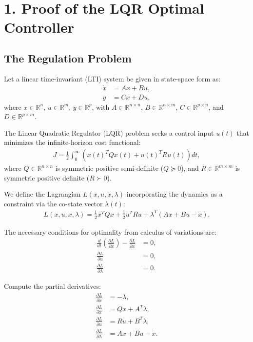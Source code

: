 \section*{1. Proof of the LQR Optimal Controller}\label{sec:lqr-proof}

\subsection*{The Regulation Problem}
Let a linear time-invariant (LTI) system be given in state-space form as:
\begin{align*}
\dot{x} &= Ax + Bu, \\
y &= Cx + Du,
\end{align*}
where $x \in \mathbb{R}^n$, $u \in \mathbb{R}^m$, $y \in \mathbb{R}^p$, with $A \in \mathbb{R}^{n \times n}$, $B \in \mathbb{R}^{n \times m}$, $C \in \mathbb{R}^{p \times n}$, and $D \in \mathbb{R}^{p \times m}$.

The Linear Quadratic Regulator (LQR) problem seeks a control input $u(t)$ that minimizes the infinite-horizon cost functional:
\begin{align*}
J = \frac{1}{2} \int_0^\infty \left( x(t)^T Q x(t) + u(t)^T R u(t) \right) d t,
\end{align*}
where $Q \in \mathbb{R}^{n \times n}$ is symmetric positive semi-definite ($Q \succeq 0$), and $R \in \mathbb{R}^{m \times m}$ is symmetric positive definite ($R \succ 0$).

\hrulefill

We define the Lagrangian \( L(x, u, \dot{x}, \lambda) \) incorporating the dynamics as a constraint via the co-state vector $\lambda(t)$:
\begin{align*}
L(x,u,\dot{x},\lambda) = \frac{1}{2} x^T Q x + \frac{1}{2} u^T R u + \lambda^T (Ax + Bu - \dot{x}).
\end{align*}

\hrulefill

The necessary conditions for optimality from calculus of variations are:
\begin{align*}
\frac{d}{dt} \left( \frac{\partial L}{\partial \dot{x}} \right) - \frac{\partial L}{\partial x} &= 0, \\
\frac{\partial L}{\partial u} &= 0, \\
\frac{\partial L}{\partial \lambda} &= 0.
\end{align*}

Compute the partial derivatives:
\begin{align*}
\frac{\partial L}{\partial \dot{x}} &= -\lambda, \\
\frac{\partial L}{\partial x} &= Qx + A^T \lambda, \\
\frac{\partial L}{\partial u} &= R u + B^T \lambda, \\
\frac{\partial L}{\partial \lambda} &= Ax + Bu - \dot{x}.
\end{align*}


